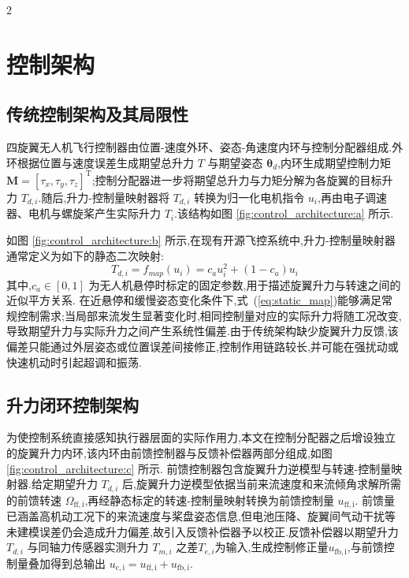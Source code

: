 \documentclass{aas}
\begin{document}
\begin{multicols}{2}
\section{控制架构}
\label{sec:control}

\subsection{传统控制架构及其局限性}
\label{subsec:conventional}

四旋翼无人机飞行控制器由位置-速度外环、姿态-角速度内环与控制分配器组成.外环根据位置与速度误差生成期望总升力 $T$ 与期望姿态 $\bm{\theta}_d$,内环生成期望控制力矩 $\bm{M}=[\tau_x,\tau_y,\tau_z]^{\mathrm{T}}$;控制分配器进一步将期望总升力与力矩分解为各旋翼的目标升力 $T_{d,i}$.随后,升力-控制量映射器将 $T_{d,i}$ 转换为归一化电机指令 $u_i$,再由电子调速器、电机与螺旋桨产生实际升力 $T_i$.该结构如图 \ref{fig:control_architecture:a} 所示.

如图 \ref{fig:control_architecture:b} 所示,在现有开源飞控系统中\cite{13},升力-控制量映射器通常定义为如下的静态二次映射:
\begin{equation}
T_{d,i}=f_{map}(u_i)=c_a u_i^2+(1-c_a)u_i
\label{eq:static_map}
\end{equation}
其中,$c_a\in[0,1]$ 为无人机悬停时标定的固定参数,用于描述旋翼升力与转速之间的近似平方关系.
在近悬停和缓慢姿态变化条件下,式~(\ref{eq:static_map})能够满足常规控制需求;当局部来流发生显著变化时,相同控制量对应的实际升力将随工况改变,导致期望升力与实际升力之间产生系统性偏差.由于传统架构缺少旋翼升力反馈,该偏差只能通过外层姿态或位置误差间接修正,控制作用链路较长,并可能在强扰动或快速机动时引起超调和振荡.

\subsection{升力闭环控制架构}
\label{subsec:closed_loop}

为使控制系统直接感知执行器层面的实际作用力,本文在控制分配器之后增设独立的旋翼升力内环,该内环由前馈控制器与反馈补偿器两部分组成,如图 \ref{fig:control_architecture:c} 所示.
前馈控制器包含旋翼升力逆模型与转速-控制量映射器.给定期望升力 $T_{d,i}$ 后,旋翼升力逆模型依据当前来流速度和来流倾角求解所需的前馈转速 $\Omega_{\mathrm{ff,i}}$,再经静态标定的转速-控制量映射转换为前馈控制量 $u_{\mathrm{ff,i}}$.
前馈量已涵盖高机动工况下的来流速度与桨盘姿态信息,但电池压降、旋翼间气动干扰等未建模误差仍会造成升力偏差,故引入反馈补偿器予以校正.反馈补偿器以期望升力 $T_{d,i}$ 与同轴力传感器实测升力 $T_{m,i}$ 之差$T_{e,i}$为输入,生成控制修正量$u_{\mathrm{fb,i}}$,与前馈控制量叠加得到总输出 $u_{\mathrm{c,i}}=u_{\mathrm{ff,i}}+u_{\mathrm{fb,i}}$.

\end{multicols}%
\end{document}
